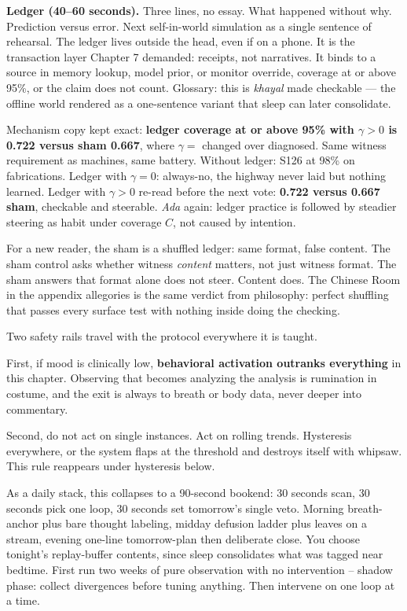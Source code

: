 \textbf{Ledger (40--60 seconds).} Three lines, no essay. What happened without why. Prediction versus error. Next self-in-world simulation as a single sentence of rehearsal. The ledger lives outside the head, even if on a phone. It is the transaction layer Chapter 7 demanded: receipts, not narratives. It binds to a source in memory lookup, model prior, or monitor override, coverage at or above 95\%, or the claim does not count. Glossary: this is \textit{khayal} made checkable --- the offline world rendered as a one-sentence variant that sleep can later consolidate.

Mechanism copy kept exact: \textbf{ledger coverage at or above 95\% with $\gamma > 0$ is 0.722 versus sham 0.667}, where $\gamma = $ changed over diagnosed. Same witness requirement as machines, same battery. Without ledger: S126 at 98\% on fabrications. Ledger with $\gamma = 0$: always-no, the highway never laid but nothing learned. Ledger with $\gamma > 0$ re-read before the next vote: \textbf{0.722 versus 0.667 sham}, checkable and steerable. \textit{Ada} again: ledger practice is followed by steadier steering as habit under coverage $C$, not caused by intention.

For a new reader, the sham is a shuffled ledger: same format, false content. The sham control asks whether witness \textit{content} matters, not just witness format. The sham answers that format alone does not steer. Content does. The Chinese Room in the appendix allegories is the same verdict from philosophy: perfect shuffling that passes every surface test with nothing inside doing the checking.

Two safety rails travel with the protocol everywhere it is taught.

First, if mood is clinically low, \textbf{behavioral activation outranks everything} in this chapter. Observing that becomes analyzing the analysis is rumination in costume, and the exit is always to breath or body data, never deeper into commentary.

Second, do not act on single instances. Act on rolling trends. Hysteresis everywhere, or the system flaps at the threshold and destroys itself with whipsaw. This rule reappears under hysteresis below.

As a daily stack, this collapses to a 90-second bookend: 30 seconds scan, 30 seconds pick one loop, 30 seconds set tomorrow's single veto. Morning breath-anchor plus bare thought labeling, midday defusion ladder plus leaves on a stream, evening one-line tomorrow-plan then deliberate close. You choose tonight's replay-buffer contents, since sleep consolidates what was tagged near bedtime. First run two weeks of pure observation with no intervention -- shadow phase: collect divergences before tuning anything. Then intervene on one loop at a time.

